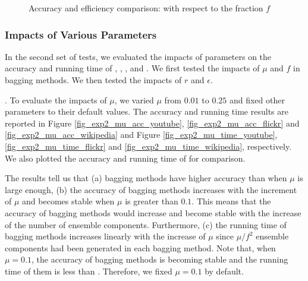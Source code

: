 {\begin{figure}[tb!]
  \quad\quad
  \vspace{-2ex}
  \caption{Accuracy and efficiency comparison: with respect to the fraction $f$}\label{fig_exp2_f}
  \vspace{-3ex}
\end{figure}
}%






\subsubsection{Impacts of Various Parameters}
In the second set of tests, we evaluated the impacts of parameters on
the accuracy and running time of \NMF, \Node, \Edge, \Biased and \BIGCLAM. We first
tested the impacts of $\mu$ and $f$ in bagging methods. We then
tested the impacts of $r$ and $\epsilon$.



. To evaluate the impacts of $\mu$, we
varied $\mu$ from $0.01$ to $0.25$ and fixed other parameters to their
default values. The accuracy and running time results are reported in
Figure \ref{fig_exp2_mu_acc_youtube}, \ref{fig_exp2_mu_acc_flickr} and
\ref{fig_exp2_mu_acc_wikipedia} and Figure \ref{fig_exp2_mu_time_youtube},
\ref{fig_exp2_mu_time_flickr} and \ref{fig_exp2_mu_time_wikipedia},
respectively. We also plotted the accuracy and running time of \NMF for comparison.




The results tell us that (a) bagging methods have higher accuracy than
\NMF when $\mu$ is large enough, (b) the accuracy of bagging methods
increases with the increment of $\mu$ and becomes stable when $\mu$ is greater
than $0.1$. This means that the accuracy of bagging methods would increase and become stable with
the increase of the number of ensemble components. Furthermore,
(c) the running time of bagging methods increases linearly
with the increase of $\mu$ since $\mu / f^2$ ensemble components had been generated in each bagging
method. Note that, when $\mu = 0.1$, the accuracy of bagging methods
is becoming stable and the running time of them is less than
\NMF. Therefore, we fixed $\mu = 0.1$ by default.




